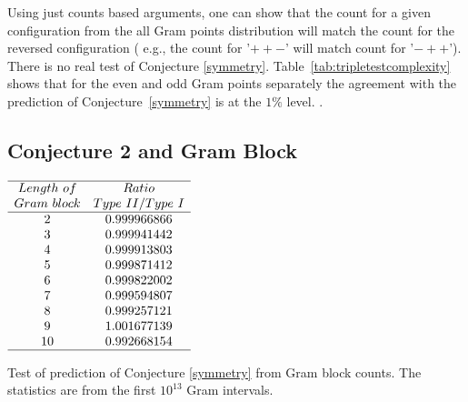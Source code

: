 \documentclass[twoside]{article}
\begin{document}
Using just counts based arguments, one can show that the count for a given configuration from the all Gram points distribution  will match the count for the reversed configuration ( e.g., the count for '$++-$' will match count for '$-++$'). There is no real test of Conjecture \ref{symmetry}.
Table~\ref{tab:tripletestcomplexity} shows that for the even and odd Gram points separately the agreement with the prediction of Conjecture~\ref{symmetry} is at the $1\%$ level. .

\subsection{\label{sec4c}Conjecture 2 and Gram Block}

\begin{table}
\centering \(\begin{array}{cc}
\hline
Length~of 	& Ratio  \\
Gram~block	& Type~II/Type~I \\
\hline
2& 0.999966866\\
3& 0.999941442\\
4& 0.999913803\\
5& 0.999871412\\
6& 0.999822002\\
7& 0.999594807\\
8& 0.999257121\\
9& 1.001677139\\
10& 0.992668154\\
\hline
\end{array}\)
\caption{Test of prediction of Conjecture \ref{symmetry} from Gram block counts. The statistics are from the first $10^{13}$ Gram intervals.} \label{tab:rosser}
\end{table}
\end{document}
